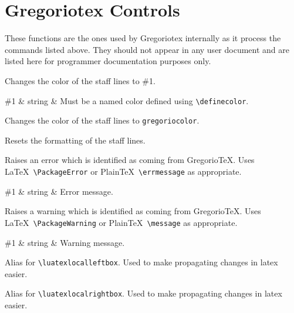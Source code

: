 \section{Gregoriotex Controls}

These functions are the ones used by Gregoriotex internally as it
process the commands listed above.  They should not appear in any user
document and are listed here for programmer documentation purposes
only.

Changes the color of the staff lines to \#1.

\begin{argtable}
  \#1 & string & Must be a named color defined using \verb=\definecolor=.
\end{argtable}

Changes the color of the staff lines to \verb=gregoriocolor=.

Resets the formatting of the staff lines.

Raises an error which is identified as coming from GregorioTeX.  Uses
\LaTeX\ \verb=\PackageError= or Plain\TeX\ \verb=\errmessage= as
appropriate.

\begin{argtable}
  \#1 & string & Error message.\\
\end{argtable}
	
Raises a warning which is identified as coming from GregorioTeX.  Uses
\LaTeX\ \verb=\PackageWarning= or Plain\TeX\ \verb=\message= as
appropriate.

\begin{argtable}
  \#1 & string & Warning message.\\
\end{argtable}
	
Alias for \verb=\luatexlocalleftbox=.  Used to make propagating
changes in latex easier.

Alias for \verb=\luatexlocalrightbox=.  Used to make propagating
changes in latex easier.
	
